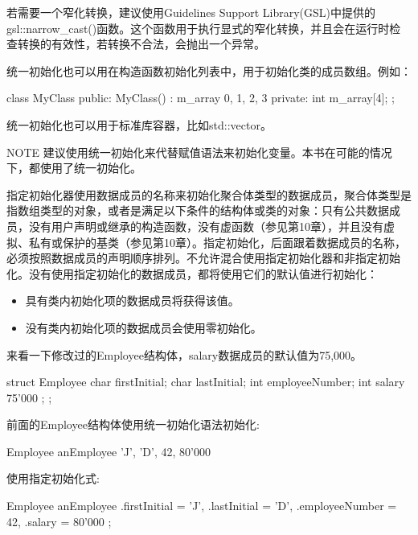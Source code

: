 若需要一个窄化转换，建议使用Guidelines Support Library(GSL)中提供的gsl::narrow\_cast()函数。这个函数用于执行显式的窄化转换，并且会在运行时检查转换的有效性，若转换不合法，会抛出一个异常。

统一初始化也可以用在构造函数初始化列表中，用于初始化类的成员数组。例如：

\begin{cpp}
class MyClass
{
    public:
        MyClass()
            : m_array { 0, 1, 2, 3 }
        {
        }
    private:
        int m_array[4];
};
\end{cpp}

统一初始化也可以用于标准库容器，比如std::vector。

\begin{myNotic}{NOTE}
建议使用统一初始化来代替赋值语法来初始化变量。本书在可能的情况下，都使用了统一初始化。
\end{myNotic}


指定初始化器使用数据成员的名称来初始化聚合体类型的数据成员，聚合体类型是指数组类型的对象，或者是满足以下条件的结构体或类的对象：只有公共数据成员，没有用户声明或继承的构造函数，没有虚函数（参见第10章），并且没有虚拟、私有或保护的基类（参见第10章）。指定初始化，后面跟着数据成员的名称，必须按照数据成员的声明顺序排列。不允许混合使用指定初始化器和非指定初始化。没有使用指定初始化的数据成员，都将使用它们的默认值进行初始化：

\begin{itemize}
\item
具有类内初始化项的数据成员将获得该值。

\item
没有类内初始化项的数据成员会使用零初始化。
\end{itemize}

来看一下修改过的Employee结构体，salary数据成员的默认值为75,000。

\begin{cpp}
struct Employee {
    char firstInitial;
    char lastInitial;
    int employeeNumber;
    int salary { 75'000 };
};
\end{cpp}

前面的Employee结构体使用统一初始化语法初始化:

\begin{cpp}
Employee anEmployee { 'J', 'D', 42, 80'000 }
\end{cpp}

使用指定初始化式:

\begin{cpp}
Employee anEmployee {
    .firstInitial = 'J',
    .lastInitial = 'D',
    .employeeNumber = 42,
    .salary = 80'000
};
\end{cpp}

